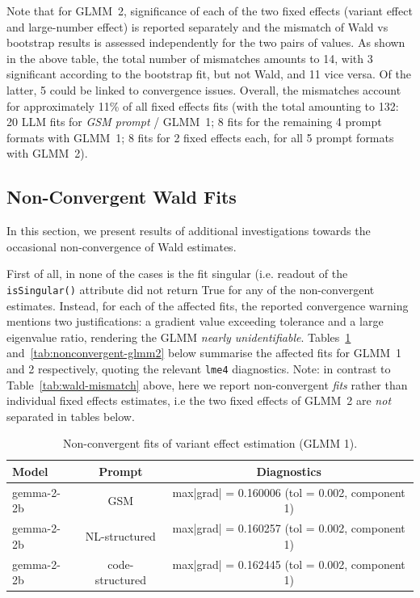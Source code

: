 \documentclass[11pt]{article}
\begin{document}
Note that for GLMM~2, significance of each of the two fixed effects (variant effect and large-number effect) is reported separately and the mismatch of Wald vs bootstrap results is assessed independently for the two pairs of values. As shown in the above table, the total number of mismatches amounts to 14, with 3 significant according to the bootstrap fit, but not Wald, and 11 vice versa. Of the latter, 5 could be linked to convergence issues. Overall, the mismatches account for approximately 11\% of all fixed effects fits (with the total amounting to 132: 20 LLM fits for \textit{GSM prompt} / GLMM~1; 8 fits for the remaining 4 prompt formats with GLMM~1; 8 fits for 2 fixed effects each, for all 5 prompt formats with GLMM~2).


\subsection{Non-Convergent Wald Fits}
In this section, we present results of additional investigations towards the occasional non-convergence of Wald estimates.

First of all, in none of the cases is the fit singular (i.e. readout of the \texttt{isSingular()} attribute did not return True for any of the non-convergent estimates. Instead, for each of the affected fits, the reported convergence warning mentions two justifications: a gradient value exceeding tolerance and a large eigenvalue ratio, rendering the GLMM \textit{nearly unidentifiable}.
Tables~\ref{tab:nonconvergent-glmm1} and~\ref{tab:nonconvergent-glmm2} below summarise the affected fits for GLMM~1 and 2 respectively, quoting the relevant \texttt{lme4} diagnostics. Note: in contrast to Table~\ref{tab:wald-mismatch} above, here we report non-convergent \textit{fits} rather than individual fixed effects estimates, i.e the two fixed effects of GLMM~2 are \textit{not} separated in tables below.

\begin{table}[H]
\centering
\small
\begin{tabular}{lcc}
\toprule
Model & Prompt & Diagnostics \\
\midrule
gemma-2-2b & GSM & max|grad| = 0.160006 (tol = 0.002, component 1) \\
gemma-2-2b & NL-structured & max|grad| = 0.160257 (tol = 0.002, component 1) \\
gemma-2-2b & code-structured & max|grad| = 0.162445 (tol = 0.002, component 1) \\
\bottomrule
\end{tabular}
\caption{Non-convergent fits of variant effect estimation (GLMM 1).}
\label{tab:nonconvergent-glmm1}
\end{table}
\end{document}
